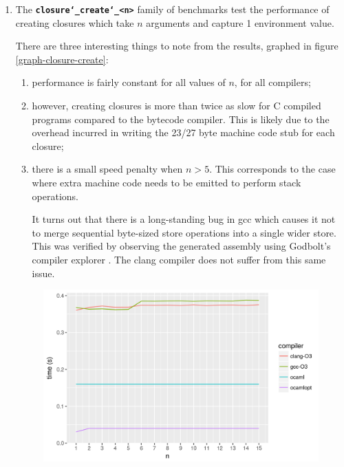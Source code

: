 \documentclass[12pt,a4paper,twoside,openright]{report}
\begin{document}
\begin{enumerate}
  \item
    The \textbf{\texttt{closure\char`_create\char`_<n>}} family of benchmarks test the performance of
    creating closures which take $n$ arguments and capture 1 environment value.

    There are three interesting things to note from the results, graphed in figure \ref{graph-closure-create}:
    \begin{enumerate}
      \item performance is fairly constant for all values of $n$, for all compilers;
      \item however, creating closures is more than twice as slow for C
        compiled programs compared to the bytecode compiler. This is likely
        due to the overhead incurred in writing the 23/27 byte machine code stub
        for each closure;

      \item there is a small speed penalty when $n>5$. This
        corresponds to the case where extra machine code needs to be emitted to
        perform stack operations.

        It turns out that there is a long-standing
        bug in gcc which causes it not to merge sequential byte-sized store
        operations into a single wider store. This was verified by observing
        the generated assembly using Godbolt's compiler explorer
        \cite{godbolt}. The clang compiler does not suffer from this same
        issue.
    \end{enumerate}

    \begin{figure}[h]
\centering
  \includegraphics[width=16cm]{resultclosure_create_summary_all-b477d4580}


\end{figure}
\end{enumerate}
\end{document}
